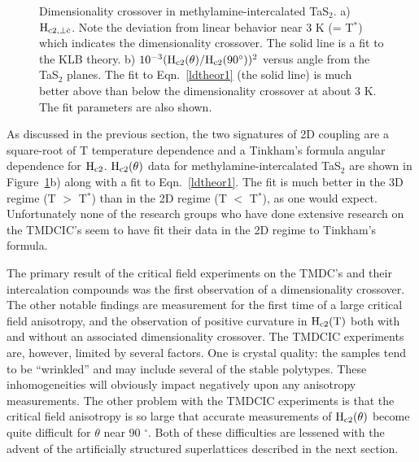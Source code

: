 \begin{figure}
\vspace{16cm}
\caption[Dimensionality crossover in methylamine-intercalated TaS$_2$]{Dimensionality crossover in methylamine-intercalated TaS$_2$.\cite{coleman83}
a) $\rm H_{c2,  \perp \hat{c}}$.  Note the  deviation from  linear behavior
near 3 K (= T$^*$) which indicates the dimensionality crossover.  The solid
line     is  a fit   to    the     KLB  theory.\cite{klemm75}     b)   $\rm
10^{-3}(H_{c2}(\theta)/H_{c2}(90^{\circ}))^2$ versus angle from the TaS$_2$
planes.   The fit to  Eqn.~\ref{ldtheor1} (the  solid  line) is much better
above  than  below  the dimensionality  crossover  at about  3  K.  The fit
parameters are also shown.}
\label{tmdcic}
\end{figure}

        As discussed  in the previous  section,  the two  signatures of  2D
coupling are a square-root of   T temperature   dependence and a  Tinkham's
formula   angular    dependence for $\rm H_{c2}$.      $\rm    H_{c2}(\theta)$    data   for
methylamine-intercalated  TaS$_2$ are shown in  Figure~\ref{tmdcic}b) along
with a fit  to Eqn.~\ref{ldtheor1}.\cite{coleman83}  The fit is much better
in the 3D regime (T $>$ T$^*$) than in the 2D regime (T $<$ T$^*$),  as one
would expect.   Unfortunately none  of the  research groups  who  have done
extensive research on the TMDCIC's seem to  have fit their  data in  the 2D
regime to Tinkham's formula.\cite{coleman83,prober80}

	The  primary result of  the critical field experiments on  the TMDC's
and  their   intercalation compounds   was  the   first observation   of  a
dimensionality crossover.  The other  notable findings are measurement for
the first time of a large critical field anisotropy, and the observation of
positive curvature in  $\rm H_{c2}(T)$  both with and without an associated
dimensionality crossover.  The TMDCIC experiments are, however, limited by
several factors.  One   is  crystal   quality: the  samples   tend to   be
``wrinkled''      and   may       include     several   of    the    stable
polytypes.\cite{prober80}  These inhomogeneities    will   obviously impact
negatively upon any anisotropy measurements.  The other problem with the
TMDCIC experiments is that the critical field  anisotropy is so  large that
accurate measurements of $\rm H_{c2}(\theta)$ become quite difficult for
$\theta$ near 90 $^{\circ}$.  Both
of  these difficulties are  lessened with   the advent of the artificially
structured superlattices described in the next section.


